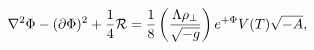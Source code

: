 \begin{equation}\label{bulk_dilaton}
\nabla^{2}\Phi - (\partial\Phi)^{2} + {\frac{1}{4}} {\cal R} =
{\frac{1}{8}} \left({\frac{\Lambda\rho_{\perp}}{\sqrt{-g}}}\right)
e^{+\Phi}V(T)\sqrt{-A},
\end{equation}

